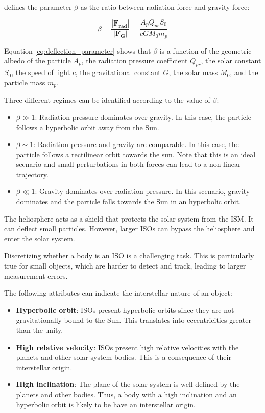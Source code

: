 \cite{sterken2012} defines the parameter $\beta$ as the ratio between radiation
force and gravity force:

\begin{equation}
    \beta = \frac{|\bm{F_{\text{rad}}}|}{|\bm{F_{\text{G}}}|} = \frac{A_p Q_{pr} S_0}{cG M_{0} m_p}
    \label{eq:deflection_parameter}
\end{equation}

Equation \ref{eq:deflection_parameter} shows that $\beta$ is a function of the
geometric albedo of the particle $A_p$, the radiation pressure coefficient $Q_{pr}$,
the solar constant $S_0$, the speed of light $c$, the gravitational constant $G$,
the solar mass $M_0$, and the particle mass $m_p$.

Three different regimes can be identified according to the value of $\beta$:

\begin{itemize}
    \item $\beta \gg 1$: Radiation pressure dominates over gravity. In this case,
          the particle follows a hyperbolic orbit away from the Sun.
    \item $\beta \sim 1$: Radiation pressure and gravity are comparable. In this
          case, the particle follows a rectilinear orbit towards the sun. Note
          that this is an ideal scenario and small perturbations in both
          forces can lead to a non-linear trajectory.
    \item $\beta \ll 1$: Gravity dominates over radiation pressure. In this
          scenario, gravity dominates and the particle falls towards the Sun in an
          hyperbolic orbit.
\end{itemize}


The heliosphere acts as a shield that protects the solar system from the ISM. It
can deflect small particles. However, larger ISOs can bypass the heliosphere
and enter the solar system.

Discretizing whether a body is an ISO is a challenging task. This is
particularly true for small objects, which are harder to detect and track,
leading to larger measurement errors. 

The following attributes can indicate the interstellar nature of an object:

\begin{itemize}
    \item \textbf{Hyperbolic orbit}: ISOs present hyperbolic orbits since they
          are not gravitationally bound to the Sun. This translates into
          eccentricities greater than the unity.
    \item \textbf{High relative velocity}: ISOs present high relative velocities
          with the planets and other solar system bodies. This is a consequence
          of their interstellar origin.
    \item \textbf{High inclination}: The plane of the solar system is well
          defined by the planets and other bodies. Thus, a body with a high
          inclination and an hyperbolic orbit is likely to be have an
          interstellar origin.
\end{itemize}


